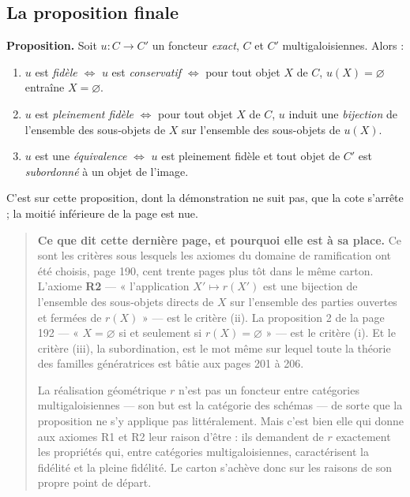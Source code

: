 \documentclass[11pt,a4paper]{article}
\begin{document}
\subsection*{La proposition finale}

\textbf{Proposition.} Soit $u : C \to C'$ un foncteur \emph{exact}, $C$ et
$C'$ multigaloisiennes. Alors :

\begin{enumerate}
  \item[(i)] $u$ est \emph{fidèle} $\Longleftrightarrow$ $u$ est
    \emph{conservatif} $\Longleftrightarrow$ pour tout objet $X$ de $C$,
    $u(X) = \varnothing$ entraîne $X = \varnothing$.
  \item[(ii)] $u$ est \emph{pleinement fidèle} $\Longleftrightarrow$ pour tout
    objet $X$ de $C$, $u$ induit une \emph{bijection} de l'ensemble des
    sous-objets de $X$ sur l'ensemble des sous-objets de $u(X)$.
  \item[(iii)] $u$ est une \emph{équivalence} $\Longleftrightarrow$ $u$ est
    pleinement fidèle et tout objet de $C'$ est \emph{subordonné} à un objet de
    l'image.
\end{enumerate}

C'est sur cette proposition, dont la démonstration ne suit pas, que la cote
s'arrête ; la moitié inférieure de la page est nue.

\begin{quote}
\textbf{Ce que dit cette dernière page, et pourquoi elle est à sa place.} Ce
sont les critères sous lesquels les axiomes du domaine de ramification ont été
choisis, page 190, cent trente pages plus tôt dans le même carton. L'axiome
\textbf{R2} --- « l'application $X' \mapsto r(X')$ est une bijection de
l'ensemble des sous-objets directs de $X$ sur l'ensemble des parties ouvertes
et fermées de $r(X)$ » --- est le critère (ii). La proposition 2 de la page
192 --- « $X = \varnothing$ si et seulement si $r(X) = \varnothing$ » --- est
le critère (i). Et le critère (iii), la subordination, est le mot même sur
lequel toute la théorie des familles génératrices est bâtie aux pages 201 à
206.

La réalisation géométrique $r$ n'est pas un foncteur entre catégories
multigaloisiennes --- son but est la catégorie des schémas --- de sorte que la
proposition ne s'y applique pas littéralement. Mais c'est bien elle qui donne
aux axiomes R1 et R2 leur raison d'être : ils demandent de $r$ exactement les
propriétés qui, entre catégories multigaloisiennes, caractérisent la fidélité
et la pleine fidélité. Le carton s'achève donc sur les raisons de son propre
point de départ.
\end{quote}
\end{document}
